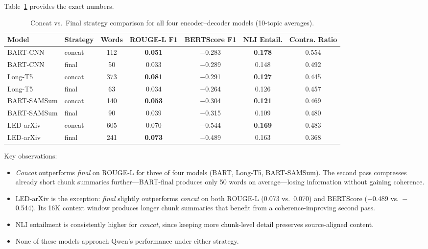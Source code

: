 Table~\ref{tab:strategy} provides the exact numbers.

\begin{table}[H]
\centering
\caption{Concat vs.\ Final strategy comparison for all four encoder--decoder models (10-topic averages).}
\label{tab:strategy}
\begin{tabular}{llccccc}
\toprule
Model & Strategy & Words & ROUGE-L F1 & BERTScore F1 & NLI Entail. & Contra. Ratio \\
\midrule
BART-CNN & concat & 112 & \textbf{0.051} & $-$0.283 & \textbf{0.178} & 0.554 \\
BART-CNN & final & 50 & 0.033 & $-$0.289 & 0.148 & 0.492 \\
\midrule
Long-T5 & concat & 373 & \textbf{0.081} & $-$0.291 & \textbf{0.127} & 0.445 \\
Long-T5 & final & 63 & 0.034 & $-$0.264 & 0.126 & 0.457 \\
\midrule
BART-SAMSum & concat & 140 & \textbf{0.053} & $-$0.304 & \textbf{0.121} & 0.469 \\
BART-SAMSum & final & 90 & 0.039 & $-$0.315 & 0.109 & 0.480 \\
\midrule
LED-arXiv & concat & 605 & 0.070 & $-$0.544 & \textbf{0.169} & 0.483 \\
LED-arXiv & final & 241 & \textbf{0.073} & $-$0.489 & 0.163 & 0.368 \\
\bottomrule
\end{tabular}
\end{table}

Key observations:
\begin{itemize}
    \item \textit{Concat} outperforms \textit{final} on ROUGE-L for three of four models (BART, Long-T5, BART-SAMSum). The second pass compresses already short chunk summaries further---BART-final produces only 50 words on average---losing information without gaining coherence.
    \item LED-arXiv is the exception: \textit{final} slightly outperforms \textit{concat} on both ROUGE-L (0.073 vs.\ 0.070) and BERTScore ($-$0.489 vs.\ $-$0.544). Its 16K context window produces longer chunk summaries that benefit from a coherence-improving second pass.
    \item NLI entailment is consistently higher for \textit{concat}, since keeping more chunk-level detail preserves source-aligned content.
    \item None of these models approach Qwen's performance under either strategy.
\end{itemize}

